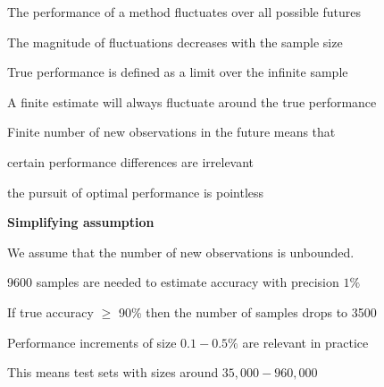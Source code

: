 \documentclass[landscape,footrule]{foils}
\begin{document}

\begin{triangles}
\item The performance of a method fluctuates over all possible futures
\item The magnitude of fluctuations decreases with the sample size
\item True performance is defined as a limit over the infinite sample
\item A finite estimate will always fluctuate around the true performance
\end{triangles}
\vspace*{1.5cm}

Finite number of new observations in the future means that
\begin{triangles}
\item certain performance differences are irrelevant
\item the pursuit of optimal performance is pointless
\end{triangles}

\vspace*{2.0cm}
\textbf{Simplifying assumption}
\begin{triangles}
\item We assume that the number of new observations is unbounded.
\end{triangles}




\begin{triangles}
\item 9600 samples are needed to estimate accuracy with precision $1\%$
\item If true accuracy $\geq$ 90\% then the number of samples drops to 3500
\item Performance increments of size $0.1-0.5\%$ are relevant in practice
\item This means test sets with sizes around $35,000-960,000$ 
\end{triangles}



\end{document}
